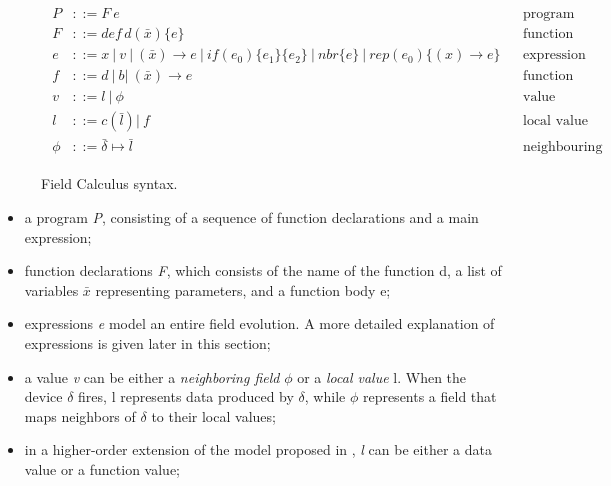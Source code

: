 \begin{figure}
    \begin{align*}
        \boxed{
            \begin{aligned}
                P    & ::= F\ e                                                                                                                   &  & \text{program}                  \\
                F    & ::= def \, d(\bar{x}) \{e\}                                                                                                &  & \text{function declaration}     \\
                e    & ::= x \ | \ v \ | \ (\bar{x}) \rightarrow e \ | \ if(e_0)\{e_1\}\{e_2\} \ | \ nbr\{e\} \ | \ rep(e_0)\{(x) \rightarrow e\} &  & \text{expression}               \\
                f    & ::= d \ | \ b    | \     (\bar{x}) \rightarrow e                                                                           &  & \text{function name}            \\
                v    & ::= l \ | \ \phi                                                                                                           &  & \text{value}                    \\
                l    & ::= c(\bar{l})     | \ f                                                                                                   &  & \text{local value}              \\
                \phi & ::= \bar{\delta} \mapsto \bar{l}                                                                                           &  & \text{neighbouring field value}
            \end{aligned}
        }
    \end{align*}
    \caption{Field Calculus syntax\cite{10.1145/3285956}.}
    \label{fig:fc-syntax}
\end{figure}

\begin{itemize}
    \item a program \textit{P}, consisting of a sequence of function declarations and a main expression;
    \item function declarations \textit{F}, which consists of the name of the function d, a list of variables $\bar{x}$ representing parameters, and a function body e;
    \item expressions \textit{e} model an entire field evolution. A more detailed explanation of expressions is given later in this section;
    \item a value \textit{v} can be either a \textit{neighboring field} $\phi$ or a \textit{local value} l. When the device $\delta$ fires, l represents data produced by $\delta$, while $\phi$ represents a field that maps neighbors of $\delta$ to their local values;
    \item in a higher-order extension of the model proposed in \cite{10.1145/3285956}, \textit{l} can be either a data value or a function value;
\end{itemize}

